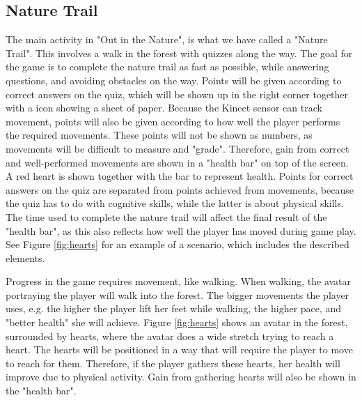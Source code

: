 \subsection{Nature Trail}
The main activity in "Out in the Nature", is what we have called a "Nature Trail". This involves a walk in the forest with quizzes along the way. The goal for the game is to complete the nature trail as fast as possible, while answering questions, and avoiding obstacles on the way. Points will be given according to correct answers on the quiz, which will be shown up in the right corner together with a icon showing a sheet of paper. Because the Kinect sensor can track movement, points will also be given according to how well the player performs the required movements. These points will not be shown as numbers, as movements will be difficult to measure and "grade". Therefore, gain from correct and well-performed movements are shown in a "health bar" on top of the screen. A red heart is shown together with the bar to represent health. Points for correct answers on the quiz are separated from points achieved from movements, because the quiz has to do with cognitive skills, while the latter is about physical skills. The time used to complete the nature trail will affect the final result of the "health bar", as this also reflects how well the player has moved during game play.  See Figure \ref{fig:hearts} for an example of a scenario, which includes the described elements.

Progress in the game requires movement, like walking. When walking, the avatar portraying the player will walk into the forest. The bigger movements the player uses, e.g. the higher the player lift her feet while walking, the higher pace, and "better health" she will achieve. Figure \ref{fig:hearts} shows an avatar in the forest, surrounded by hearts, where the avatar does a wide stretch trying to reach a heart. The hearts will be positioned in a way that will require the player to move to reach for them. Therefore, if the player gathers these hearts, her health will improve due to physical activity. Gain from gathering hearts will also be shown in the "health bar".   

